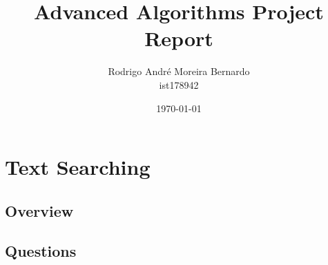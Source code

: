\documentclass[12pt, a4paper]{article}
\title{\textbf{Advanced Algorithms Project Report}}
\author{Rodrigo André Moreira Bernardo \\ ist178942}
\affil{Instituto Superior Técnico}
\date{\today}
\begin{document}
\maketitle

\section{Text Searching}
\subsection{Overview}
\subsection{Questions}

\end{document}
